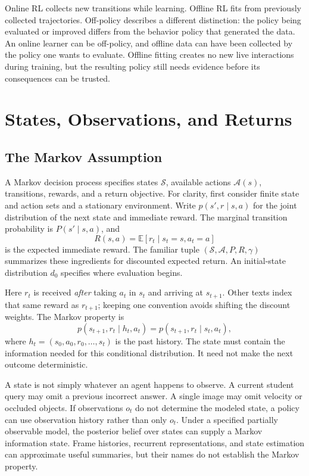 Online RL collects new transitions while learning. Offline RL fits from previously collected trajectories. Off-policy describes a different distinction: the policy being evaluated or improved differs from the behavior policy that generated the data. An online learner can be off-policy, and offline data can have been collected by the policy one wants to evaluate. Offline fitting creates no new live interactions during training, but the resulting policy still needs evidence before its consequences can be trusted.

\section{States, Observations, and Returns}

\subsection{The Markov Assumption}

A Markov decision process specifies states $\mathcal S$, available actions $\mathcal A(s)$, transitions, rewards, and a return objective. For clarity, first consider finite state and action sets and a stationary environment. Write $p(s',r\mid s,a)$ for the joint distribution of the next state and immediate reward. The marginal transition probability is $P(s'\mid s,a)$, and
\[
R(s,a)=\mathbb E[r_t\mid s_t=s,a_t=a]
\]
is the expected immediate reward. The familiar tuple $(\mathcal S,\mathcal A,P,R,\gamma)$ summarizes these ingredients for discounted expected return. An initial-state distribution $d_0$ specifies where evaluation begins.

Here $r_t$ is received \emph{after} taking $a_t$ in $s_t$ and arriving at $s_{t+1}$. Other texts index that same reward as $r_{t+1}$; keeping one convention avoids shifting the discount weights. The Markov property is
\[
p(s_{t+1},r_t\mid h_t,a_t)
=p(s_{t+1},r_t\mid s_t,a_t),
\]
where $h_t=(s_0,a_0,r_0,\ldots,s_t)$ is the past history. The state must contain the information needed for this conditional distribution. It need not make the next outcome deterministic.

A state is not simply whatever an agent happens to observe. A current student query may omit a previous incorrect answer. A single image may omit velocity or occluded objects. If observations $o_t$ do not determine the modeled state, a policy can use observation history rather than only $o_t$. Under a specified partially observable model, the posterior belief over states can supply a Markov information state. Frame histories, recurrent representations, and state estimation can approximate useful summaries, but their names do not establish the Markov property.

